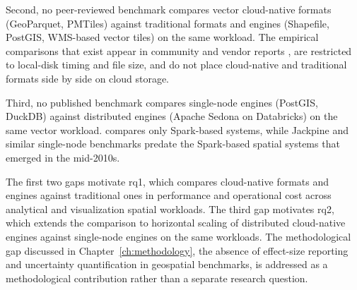 Second, no peer-reviewed benchmark compares vector cloud-native formats (GeoParquet, PMTiles) against traditional formats and engines (Shapefile, PostGIS, WMS-based vector tiles) on the same workload. The empirical comparisons that exist appear in community and vendor reports \parencite{holmes2023_geoparquet_performance, flatgeobuf2024_flatgeobuf_benchmarks}, are restricted to local-disk timing and file size, and do not place cloud-native and traditional formats side by side on cloud storage.

Third, no published benchmark compares single-node engines (PostGIS, DuckDB) against distributed engines (Apache Sedona on Databricks) on the same vector workload. \textcite{pandey2018_how_good_modern_spatial_analytics} compares only Spark-based systems, while Jackpine \parencite{ray2011_jackpine_spatial_database_benchmark} and similar single-node benchmarks predate the Spark-based spatial systems that emerged in the mid-2010s.

The first two gaps motivate \acrshort{rq}1, which compares cloud-native formats and engines against traditional ones in performance and operational cost across analytical and visualization spatial workloads. The third gap motivates \acrshort{rq}2, which extends the comparison to horizontal scaling of distributed cloud-native engines against single-node engines on the same workloads. The methodological gap discussed in Chapter~\ref{ch:methodology}, the absence of effect-size reporting and uncertainty quantification in geospatial benchmarks, is addressed as a methodological contribution rather than a separate research question.